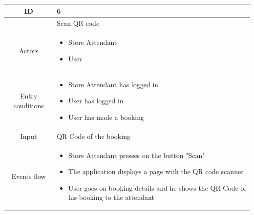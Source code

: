 \documentclass[table, 12pt]{article}
\begin{document}
\begin{longtable}{|c| p{10cm}|}
    \hline ID        & 6                                                                                                                                                                                                                                                                  \\
    \hline
                     & Scan QR code                                                                                                                                                                                                                                                       \\
    \hline
    Actors           & \begin{itemize}
        \item Store Attendant
        \item User
    \end{itemize}                                                                                                                                                                                                                                         \\
    \hline
    Entry conditions & \begin{itemize}
        \item Store Attendant has logged in
        \item User has logged in
        \item User has made a booking
    \end{itemize}                                                                                                                                                                                                                                         \\  \hline
    Input            & QR Code of the booking                                                                                                                                                                                                                                             \\
    \hline
    Events flow      & \begin{itemize}[nosep,after=\strut]
        \item Store Attendant presses on the button "Scan"
        \item The application displays a page with the QR code scanner
        \item User goes on booking details and he shows the QR Code of his booking to the attendant

\end{itemize}
\end{longtable}
\end{document}
